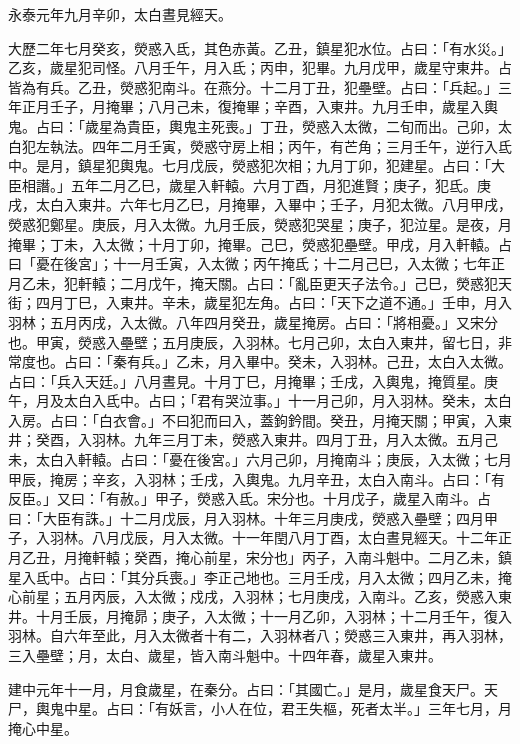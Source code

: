 \begin{pinyinscope}
 永泰元年九月辛卯，太白晝見經天。



 大歷二年七月癸亥，熒惑入氐，其色赤黃。乙丑，鎮星犯水位。占曰：「有水災。」乙亥，歲星犯司怪。八月壬午，月入氐；丙申，犯畢。九月戊甲，歲星守東井。占皆為有兵。乙丑，熒惑犯南斗。在燕分。十二月丁丑，犯壘壁。占曰：「兵起。」三年正月壬子，月掩畢；八月己未，復掩畢；辛酉，入東井。九月壬申，歲星入輿鬼。占曰：「歲星為貴臣，輿鬼主死喪。」丁丑，熒惑入太微，二旬而出。己卯，太白犯左執法。四年二月壬寅，熒惑守房上相；丙午，有芒角；三月壬午，逆行入氐中。是月，鎮星犯輿鬼。七月戊辰，熒惑犯次相；九月丁卯，犯建星。占曰：「大臣相譖。」五年二月乙巳，歲星入軒轅。六月丁酉，月犯進賢；庚子，犯氐。庚戌，太白入東井。六年七月乙巳，月掩畢，入畢中；壬子，月犯太微。八月甲戌，熒惑犯鄭星。庚辰，月入太微。九月壬辰，熒惑犯哭星；庚子，犯泣星。是夜，月掩畢；丁未，入太微；十月丁卯，掩畢。己巳，熒惑犯壘壁。甲戌，月入軒轅。占曰「憂在後宮」；十一月壬寅，入太微；丙午掩氐；十二月己巳，入太微；七年正月乙未，犯軒轅；二月戊午，掩天關。占曰：「亂臣更天子法令。」己巳，熒惑犯天街；四月丁巳，入東井。辛未，歲星犯左角。占曰：「天下之道不通。」壬申，月入羽林；五月丙戌，入太微。八年四月癸丑，歲星掩房。占曰：「將相憂。」又宋分也。甲寅，熒惑入壘壁；五月庚辰，入羽林。七月己卯，太白入東井，留七日，非常度也。占曰：「秦有兵。」乙未，月入畢中。癸未，入羽林。己丑，太白入太微。占曰：「兵入天廷。」八月晝見。十月丁巳，月掩畢；壬戌，入輿鬼，掩質星。庚午，月及太白入氐中。占曰；「君有哭泣事。」十一月己卯，月入羽林。癸未，太白入房。占曰：「白衣會。」不曰犯而曰入，蓋鉤鈐間。癸丑，月掩天關；甲寅，入東井；癸酉，入羽林。九年三月丁未，熒惑入東井。四月丁丑，月入太微。五月己未，太白入軒轅。占曰：「憂在後宮。」六月己卯，月掩南斗；庚辰，入太微；七月甲辰，掩房；辛亥，入羽林；壬戌，入輿鬼。九月辛丑，太白入南斗。占曰：「有反臣。」又曰：「有赦。」甲子，熒惑入氐。宋分也。十月戊子，歲星入南斗。占曰：「大臣有誅。」十二月戊辰，月入羽林。十年三月庚戌，熒惑入壘壁；四月甲子，入羽林。八月戊辰，月入太微。十一年閏八月丁酉，太白晝見經天。十二年正月乙丑，月掩軒轅；癸酉，掩心前星，宋分也」丙子，入南斗魁中。二月乙未，鎮星入氐中。占曰：「其分兵喪。」李正己地也。三月壬戌，月入太微；四月乙未，掩心前星；五月丙辰，入太微；戍戌，入羽林；七月庚戌，入南斗。乙亥，熒惑入東井。十月壬辰，月掩昴；庚子，入太微；十一月乙卯，入羽林；十二月壬午，復入羽林。自六年至此，月入太微者十有二，入羽林者八；熒惑三入東井，再入羽林，三入壘壁；月，太白、歲星，皆入南斗魁中。十四年春，歲星入東井。



 建中元年十一月，月食歲星，在秦分。占曰：「其國亡。」是月，歲星食天尸。天尸，輿鬼中星。占曰：「有妖言，小人在位，君王失樞，死者太半。」三年七月，月掩心中星。




\end{pinyinscope}
